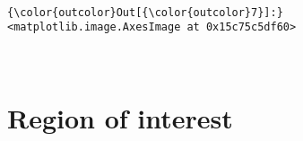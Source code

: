 \documentclass[11pt]{article}
\begin{document}
    \begin{center}
    \end{center}
    { \hspace*{\fill} \\}
    
\begin{Verbatim}[commandchars=\\\{\}]
{\color{outcolor}Out[{\color{outcolor}7}]:} <matplotlib.image.AxesImage at 0x15c75c5df60>
\end{Verbatim}
            
    \begin{center}
    \end{center}
    { \hspace*{\fill} \\}
    
    \hypertarget{region-of-interest}{%
\section{Region of interest}\label{region-of-interest}}
\end{document}
